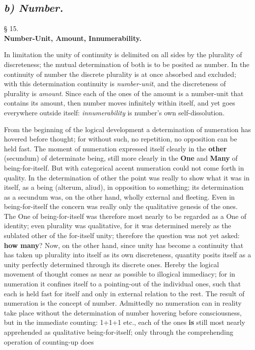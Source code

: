 \documentclass[12pt,a4paper,openany]{book}
\newcommand{\opage}[1]{\marginnote{\footnotesize\textit{[#1]}}}
\newcommand{\underafsnit}[1]{\subsection*{\centering\emph{#1}}\addcontentsline{toc}{subsection}{#1}}
\newcommand{\paragraf}[2]{\begin{center}§ #1.\\[0.2em]\textbf{#2}\end{center}}
\begin{document}
\underafsnit{b) Number.}
\paragraf{15}{Number-Unit, Amount, Innumerability.}

In limitation the unity of continuity is delimited on all sides by the plurality of discreteness; the mutual
determination of both is to be posited as number. In the continuity of number the discrete plurality is at
once absorbed and excluded; with this determination
continuity is \emph{number-unit}, and the discreteness
of plurality is \emph{amount}. Since each of the ones of the amount
\setcounter{footnote}{0}%
\opage{32}is a number-unit that contains its amount, then
number moves infinitely within itself, and yet goes
everywhere outside itself: \emph{innumerability} is number's own self-dissolution.

From the beginning of the logical development a
determination of numeration has hovered before thought; for without
such, no repetition, no opposition can
be held fast. The moment of numeration expressed itself clearly
in the \textbf{other} (secundum) of determinate being, still more clearly
in the \textbf{One} and \textbf{Many} of being-for-itself. But with categorical accent numeration could not come forth in quality.
In the determination of other the point was really
to show what it was in itself, as a being
(alterum, aliud), in opposition to something; its determination as a secundum was, on the other hand, wholly external
and fleeting. Even in being-for-itself the concern was
really only the qualitative genesis of the ones. The One of being-for-itself
was therefore most nearly to be regarded as a
One of identity; even plurality was qualitative, for
it was determined merely as the sublated other of the for-itself unity; therefore the question was not yet asked:
\textbf{how many}? Now, on the other hand, since unity has become a
continuity that has taken up plurality into itself as its own
discreteness, quantity posits itself as a unity perfectly
determined through its discrete ones.
Hereby the logical movement of thought comes as near as possible to illogical
immediacy; for in numeration it confines itself to a pointing-out of the individual
ones, such that each is held fast for itself and
only in external relation to the rest. The result of numeration is the concept of number. Admittedly no numeration can in reality
take place without the determination of number hovering before consciousness, but in the
\setcounter{footnote}{0}%
\opage{33}immediate counting: 1+1+1 etc., each of the ones \textbf{is}
still most nearly apprehended as qualitative being-for-itself; only through the comprehending operation of counting-up does
\end{document}
